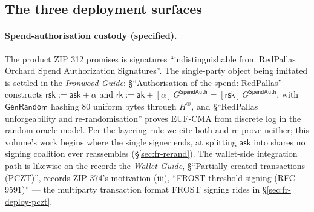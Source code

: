 \documentclass[11pt,a4paper]{article}
\theoremstyle{definition}
\newcommand{\rk}{\mathsf{rk}}
\newcommand{\ask}{\ensuremath{\mathsf{ask}}}
\newcommand{\aksym}{\ensuremath{\mathsf{ak}}}
\newcommand{\rsk}{\ensuremath{\mathsf{rsk}}}
\begin{document}
\subsection{The three deployment surfaces}\label{sec:fr-surfaces}

\paragraph{Spend-authorisation custody (specified).} The product ZIP 312
promises is signatures ``indistinguishable from RedPallas Orchard Spend
Authorization Signatures''. The single-party object being imitated is
settled in the \emph{Ironwood Guide}: \S``Authorisation of the spend:
RedPallas'' constructs $\rsk := \ask + \alpha$ and
$\rk := \aksym + [\alpha]\,G^{\mathsf{SpendAuth}} =
[\rsk]\,G^{\mathsf{SpendAuth}}$, with $\mathsf{GenRandom}$
hashing $80$ uniform bytes through $H^{\circledast}$, and \S``RedPallas
unforgeability and re-randomisation'' proves EUF-CMA from discrete log in
the random-oracle model. Per the layering rule we cite both and re-prove
neither; this volume's work begins where the single signer ends, at
splitting $\ask$ into shares no signing coalition ever
reassembles (\S\ref{sec:fr-rerand}). The wallet-side integration path is
likewise on the record: the \emph{Wallet Guide}, \S``Partially created
transactions (PCZT)'', records ZIP 374's motivation (iii), ``FROST
threshold signing (RFC 9591)'' --- the multiparty transaction format
FROST signing rides in \S\ref{sec:fr-deploy-pczt}.
\end{document}
